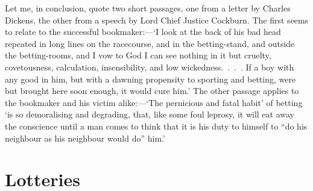 \documentclass[letterpaper,12pt,oneside,openany]{memoir}
\begin{document}
Let me, in conclusion, quote two short passages,
one from a letter by Charles Dickens, the other
from a speech by Lord Chief Justice Cockburn.
The first seems to relate to the successful bookmaker:---`I
look at the back of his bad head repeated
in long lines on the racecourse, and in the betting-stand,
and outside the betting-rooms, and I vow to
God I can see nothing in it but cruelty, covetousness,
calculation, insensibility, and low wickedness.~.~.~. If
a boy with any good in him, but with a dawning propensity
to sporting and betting, were but brought here
soon enough, it would cure him.' The other passage
applies to the bookmaker and his victim alike:---`The
pernicious and fatal habit' of betting `is so demoralising
and degrading, that, like some foul leprosy, it will
eat away the conscience until a man comes to think
that it is his duty to himself to ``do his neighbour as
his neighbour would do'' him.'

\chapter{Lotteries}
\end{document}
